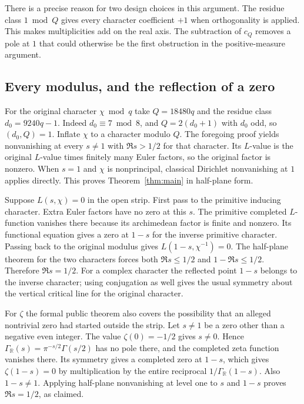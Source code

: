 There is a precise reason for two design choices in this argument. The residue class \(1\bmod Q\) gives every character coefficient \(+1\) when orthogonality is applied. This makes multiplicities add on the real axis. The subtraction of \(c_Q\) removes a pole at \(1\) that could otherwise be the first obstruction in the positive-measure argument.

\subsection{Every modulus, and the reflection of a zero}
For the original character \(\chi\bmod q\) take \(Q=18480q\) and the residue class \(d_0=9240q-1\). Indeed \(d_0\equiv7\bmod8\), and \(Q=2(d_0+1)\) with \(d_0\) odd, so \((d_0,Q)=1\). Inflate \(\chi\) to a character modulo \(Q\). The foregoing proof yields nonvanishing at every \(s\ne1\) with \(\Re s>1/2\) for that character. Its \(L\)-value is the original \(L\)-value times finitely many Euler factors, so the original factor is nonzero. When \(s=1\) and \(\chi\) is nonprincipal, classical Dirichlet nonvanishing at \(1\) applies directly. This proves Theorem~\ref{thm:main} in half-plane form.

Suppose \(L(s,\chi)=0\) in the open strip. First pass to the primitive inducing character. Extra Euler factors have no zero at this \(s\). The primitive completed \(L\)-function vanishes there because its archimedean factor is finite and nonzero. Its functional equation gives a zero at \(1-s\) for the inverse primitive character. Passing back to the original modulus gives \(L(1-s,\chi^{-1})=0\). The half-plane theorem for the two characters forces both \(\Re s\le1/2\) and \(1-\Re s\le1/2\). Therefore \(\Re s=1/2\). For a complex character the reflected point \(1-s\) belongs to the inverse character; using conjugation as well gives the usual symmetry about the vertical critical line for the original character.

For \(\zeta\) the formal public theorem also covers the possibility that an alleged nontrivial zero had started outside the strip. Let \(s\ne1\) be a zero other than a negative even integer. The value \(\zeta(0)=-1/2\) gives \(s\ne0\). Hence \(\Gamma_{\mathbb R}(s)=\pi^{-s/2}\Gamma(s/2)\) has no pole there, and the completed zeta function vanishes there. Its symmetry gives a completed zero at \(1-s\), which gives \(\zeta(1-s)=0\) by multiplication by the entire reciprocal \(1/\Gamma_{\mathbb R}(1-s)\). Also \(1-s\ne1\). Applying half-plane nonvanishing at level one to \(s\) and \(1-s\) proves \(\Re s=1/2\), as claimed.
